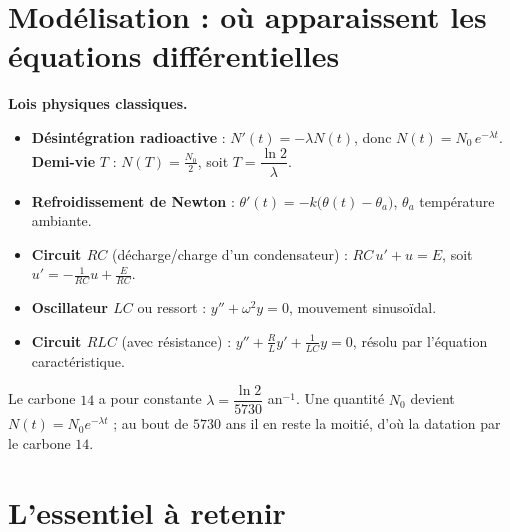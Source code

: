 \section{Modélisation : où apparaissent les équations différentielles}

\begin{aretenir}
\textbf{Lois physiques classiques.}
\begin{itemize}
\item \textbf{Désintégration radioactive} : $N'(t)=-\lambda N(t)$, donc
$N(t)=N_0\,e^{-\lambda t}$. \textbf{Demi-vie} $T$ : $N(T)=\frac{N_0}{2}$, soit
$T=\dfrac{\ln 2}{\lambda}$.
\item \textbf{Refroidissement de Newton} : $\theta'(t)=-k\big(\theta(t)-\theta_a\big)$,
$\theta_a$ température ambiante.
\item \textbf{Circuit $RC$} (décharge/charge d'un condensateur) :
$RC\,u'+u=E$, soit $u'=-\frac{1}{RC}u+\frac{E}{RC}$.
\item \textbf{Oscillateur $LC$} ou ressort : $y''+\omega^2 y=0$, mouvement
sinusoïdal.
\item \textbf{Circuit $RLC$} (avec résistance) : $y''+\frac{R}{L}y'+\frac{1}{LC}y=0$,
résolu par l'équation caractéristique.
\end{itemize}
\end{aretenir}

\begin{exemple}[Désintégration]
Le carbone $14$ a pour constante $\lambda=\dfrac{\ln 2}{5730}$ an$^{-1}$. Une
quantité $N_0$ devient $N(t)=N_0 e^{-\lambda t}$ ; au bout de $5730$ ans il en
reste la moitié, d'où la datation par le carbone $14$.
\end{exemple}

\section{L'essentiel à retenir}

